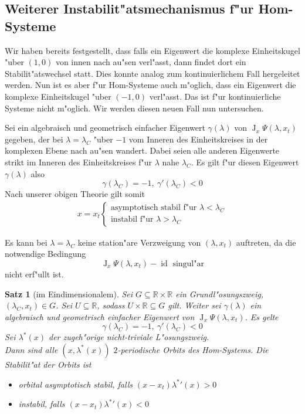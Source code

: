 \documentclass[a4paper, 13pt]{scrreprt}
\newtheorem{satz}{Satz}[section]
\theoremstyle{definition} \newtheorem{definition}{Definition}[section]
\newenvironment{bemerkung}[1][Bemerkung]{\begin{trivlist}
\item[\hskip \labelsep {\bfseries #1}]}{\end{trivlist}}
\newcommand{\RR}{\mathbb{R}}
\begin{document}
\subsection{Weiterer Instabilit"atsmechanismus f"ur Hom-Systeme}
Wir haben bereits festgestellt, dass falls ein Eigenwert die komplexe Einheitskugel "uber $(1,0)$ von innen nach au"sen verl"asst, dann findet dort ein Stabilit"atswechsel statt. Dies konnte analog zum kontinuierlichem Fall hergeleitet werden. Nun ist es aber f"ur Hom-Systeme auch m"oglich, dass ein Eigenwert die komplexe Einheitskugel "uber $(-1,0)$ verl"asst. Das ist f"ur kontinuierliche Systeme nicht m"oglich. Wir werden diesen neuen Fall nun untersuchen. 


Sei ein algebraisch und geometrisch einfacher Eigenwert $\gamma(\lambda)$ von $\operatorname{J}_x\Psi(\lambda,x_t)$ gegeben, der bei $\lambda=\lambda_C$ "uber $-1$ vom Inneren des Einheitskreises in der komplexen Ebene nach au"sen wandert. Dabei seien alle anderen Eigenwerte strikt im Inneren des Einheitskreises f"ur $\lambda$ nahe $\lambda_C$. Es gilt f"ur diesen Eigenwert $\gamma(\lambda)$ also
\[\gamma(\lambda_C)=-1,  \ \gamma'(\lambda_C)<0\]
Nach unserer obigen Theorie gilt somit 
\begin{align*}
x=x_t\begin{cases} \text{asymptotisch stabil f"ur } \lambda<\lambda_C\\
\text{instabil f"ur } \lambda>\lambda_C\end{cases}
\end{align*}

\begin{bemerkung}
Es kann bei $\lambda=\lambda_C$ keine station"are Verzweigung von $(\lambda,x_t)$ auftreten, da die notwendige Bedingung 
\[\operatorname{J}_x\Psi(\lambda,x_t)-\operatorname{id}\text{ singul"ar}\]
nicht erf"ullt ist.
\end{bemerkung}

\begin{satz}[im Eindimensionalem]
Sei $G\subseteq\RR\times\RR$ ein Grundl"osungszweig, $(\lambda_C, x_t) \in G$. Sei $U \subseteq \RR$, sodass $U\times\RR \subseteq G$ gilt. Weiter sei $\gamma(\lambda)$ ein algebraisch und geometrisch einfacher Eigenwert von $\operatorname{J}_x\Psi(\lambda, x_t)$. Es gelte
$$ \gamma(\lambda_C) = -1, \ \gamma'(\lambda_C) < 0$$
Sei $\lambda^*(x)$ der zugeh"orige nicht-triviale L"osungszweig.\\
Dann sind alle $(x, \lambda^*(x))$ $2$-periodische Orbits des Hom-Systems. Die Stabilit"at der Orbits ist 
\begin{itemize}
\item orbital asymptotisch stabil, falls $(x-x_t){\lambda^*}'(x) > 0$
\item instabil, falls $(x-x_t){\lambda^*}'(x) < 0$
\end{itemize}
\end{satz}
\end{document}
